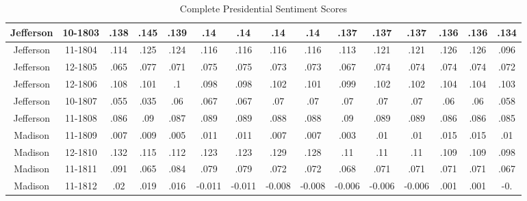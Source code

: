 \begin{sidewaystable}
\begin{singlespace}
\begin{center}
\begin{tabular}{||c c c c c c c c c c c c c c c||}
\hline
Jefferson & 10-1803 & .138 & .145 & .139 & .14 & .14 & .14 & .14 & .137 & .137 & .137 & .136 & .136 & .134 \\ 
\hline
Jefferson & 11-1804 & .114 & .125 & .124 & .116 & .116 & .116 & .116 & .113 & .121 & .121 & .126 & .126 & .096 \\ 
\hline
Jefferson & 12-1805 & .065 & .077 & .071 & .075 & .075 & .073 & .073 & .067 & .074 & .074 & .074 & .074 & .072 \\ 
\hline
Jefferson & 12-1806 & .108 & .101 & .1 & .098 & .098 & .102 & .101 & .099 & .102 & .102 & .104 & .104 & .103 \\ 
\hline
Jefferson & 10-1807 & .055 & .035 & .06 & .067 & .067 & .07 & .07 & .07 & .07 & .07 & .06 & .06 & .058 \\ 
\hline
Jefferson & 11-1808 & .086 & .09 & .087 & .089 & .089 & .088 & .088 & .09 & .089 & .089 & .086 & .086 & .085 \\ 
\hline
Madison & 11-1809 & .007 & .009 & .005 & .011 & .011 & .007 & .007 & .003 & .01 & .01 & .015 & .015 & .01 \\ 
\hline
Madison & 12-1810 & .132 & .115 & .112 & .123 & .123 & .129 & .128 & .11 & .11 & .11 & .109 & .109 & .098 \\ 
\hline
Madison & 11-1811 & .091 & .065 & .084 & .079 & .079 & .072 & .072 & .068 & .071 & .071 & .071 & .071 & .067 \\ 
\hline
Madison & 11-1812 & .02 & .019 & .016 & -0.011 & -0.011 & -0.008 & -0.008 & -0.006 & -0.006 & -0.006 & .001 & .001 & -0. \\ 
\hline
 \hline
 \end{tabular}
\end{center}
\caption{Complete Presidential Sentiment Scores}
\label{appendix:sent1}
\end{singlespace}
\end{sidewaystable}

